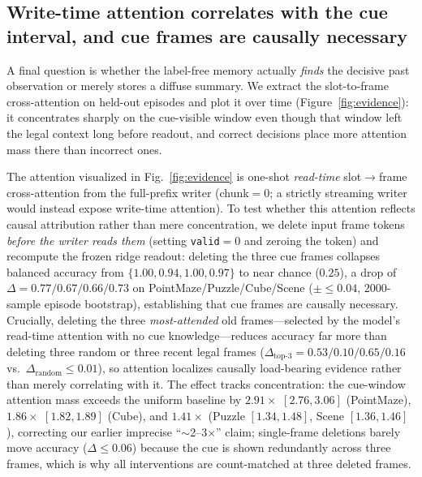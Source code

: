 \begin{table}[t]
\centering
\footnotesize
\caption{Empirical maximum passing delay (largest evaluated age with full-memory
BAcc $\ge 0.750$) and full-memory BAcc at age~128, per re-rendered environment
(protocol~P2, bounded streaming writer; \protect{}).}
\label{tab:max-delay}

\end{table}

\subsection{Write-time attention correlates with the cue interval, and cue
frames are causally necessary}
\label{sec:discovery}
A final question is whether the label-free memory actually \emph{finds} the
decisive past observation or merely stores a diffuse summary.  We extract the
slot-to-frame cross-attention on held-out episodes and plot it over time
(Figure~\ref{fig:evidence}): it concentrates sharply on the cue-visible window
even though that window left the legal context long before readout, and correct
decisions place more attention mass there than incorrect ones.

The attention visualized in Fig.~\ref{fig:evidence} is one-shot \emph{read-time}
slot$\to$frame cross-attention from the full-prefix writer (chunk$=0$; a
strictly streaming writer would instead expose write-time attention). To test
whether this attention reflects causal attribution rather than mere
concentration, we delete input frame tokens \emph{before the writer reads them}
(setting \texttt{valid}$=0$ and zeroing the token) and recompute the frozen
ridge readout: deleting the three cue frames collapses balanced accuracy from
$\{1.00,0.94,1.00,0.97\}$ to near chance ($0.25$), a drop of
$\Delta=0.77/0.67/0.66/0.73$ on PointMaze/Puzzle/Cube/Scene ($\pm{\le}0.04$,
$2000$-sample episode bootstrap), establishing that cue frames are causally
necessary. Crucially, deleting the three \emph{most-attended} old
frames---selected by the model's read-time attention with no cue
knowledge---reduces accuracy far more than deleting three random or three recent
legal frames ($\Delta_{\text{top-3}}=0.53/0.10/0.65/0.16$ vs.\
$\Delta_{\text{random}}\le0.01$), so attention localizes causally load-bearing
evidence rather than merely correlating with it. The effect tracks
concentration: the cue-window attention mass exceeds the uniform baseline by
$2.91\times$ $[2.76,3.06]$ (PointMaze), $1.86\times$ $[1.82,1.89]$ (Cube), and
$1.41\times$ (Puzzle $[1.34,1.48]$, Scene $[1.36,1.46]$), correcting our earlier
imprecise ``$\sim$2--3$\times$'' claim; single-frame deletions barely move
accuracy ($\Delta\le0.06$) because the cue is shown redundantly across three
frames, which is why all interventions are count-matched at three deleted
frames.

